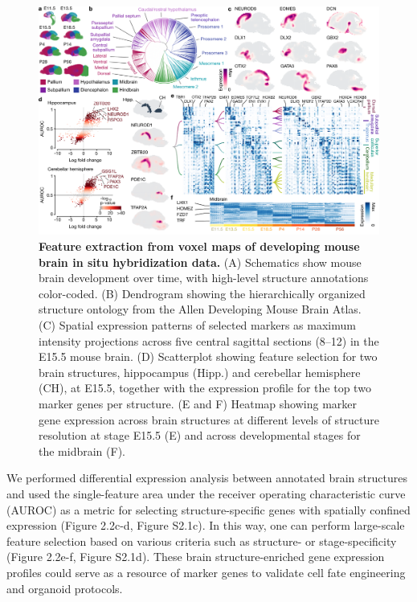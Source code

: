 \begin{figure}[t!]
    \centering
	\includegraphics[width=\textwidth]{figures/voxhunt/Figure_2}
    \caption{\textbf{Feature extraction from voxel maps of developing mouse brain in situ hybridization data.} (A) Schematics show mouse brain development over time, with high-level structure annotations color-coded. (B) Dendrogram showing the hierarchically organized structure ontology from the Allen Developing Mouse Brain Atlas. (C) Spatial expression patterns of selected markers as maximum intensity projections across five central sagittal sections (8–12) in the E15.5 mouse brain. (D) Scatterplot showing feature selection for two brain structures, hippocampus (Hipp.) and cerebellar hemisphere (CH), at E15.5, together with the expression profile for the top two marker genes per structure. (E and F) Heatmap showing marker gene expression across brain structures at different levels of structure resolution at stage E15.5 (E) and across developmental stages for the midbrain (F).}
    \label{fig:vox2}
\end{figure}


We performed differential expression analysis between annotated brain structures and used the single-feature area under the receiver operating characteristic curve (AUROC) as a metric for selecting structure-specific genes with spatially confined expression (Figure 2.2c-d, Figure S2.1c). In this way, one can perform large-scale feature selection based on various criteria such as structure- or stage-specificity (Figure 2.2e-f, Figure S2.1d). These brain structure-enriched gene expression profiles could serve as a resource of marker genes to validate cell fate engineering and organoid protocols.


